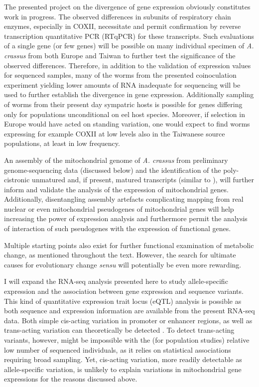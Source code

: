 \documentclass[10pt]{article}
\begin{document}
The presented project on the divergence of gene expression obviously
constitutes work in progress. The observed differences in subunits of
respiratory chain enzymes, especially in COXII, necessitate and permit
confirmation by reverse transcription quantitative PCR (RTqPCR) for
these transcripts. Such evaluations of a single gene (or few genes)
will be possible on many individual specimen of \textit{A. crassus}
from both Europe and Taiwan to further test the significance of the
observed differences. Therefore, in addition to the validation of
expression values for sequenced samples, many of the worms from the
presented coinoculation experiment yielding lower amounts of RNA
inadequate for sequencing will be used to further establish the
divergence in gene expression. Additionally sampling of worms from
their present day sympatric hosts is possible for genes differing only
for populations unconditional on eel host species. Moreover, if
selection in Europe would have acted on standing variation, one would
expect to find worms expressing for example COXII at low levels also
in the Taiwanese source populations, at least in low frequency.

An assembly of the mitochondrial genome of \textit{A. crassus} from
preliminary genome-sequencing data (discussed below) and the
identification of the poly-cistronic unmatured and, if present,
matured transcripts (similar to \cite{pmid19843606}), will further
inform and validate the analysis of the expression of mitochondrial
genes. Additionally, disentangling assembly artefacts complicating
mapping from real nuclear or even mitochondrial \cite{pmid20026478}
pseudogenes of mitochondrial genes will help increasing the power of
expression analysis and furthermore permit the analysis of interaction
of such pseudogenes with the expression of functional genes.

Multiple starting points also exist for further functional examination
of metabolic change, as mentioned throughout the text. However, the
search for ultimate causes for evolutionary change \textit{sensu}
\cite{mayr1961cause} will potentially be even more rewarding.

I will expand the RNA-seq analysis presented here to study
allele-specific expression and the association between gene expression
and sequence variants. This kind of quantitative expression trait
locus (eQTL) analysis is possible as both sequence and expression
information are available from the present RNA-seq data. Both simple
cis-acting variation in promoter or enhancer regions, as well as
trans-acting variation can theoretically be detected
\cite{pmid21838806}. To detect trans-acting variants, however, might
be impossible with the (for population studies) relative low number of
sequenced individuals, as it relies on statistical associations
requiring broad sampling. Yet, cis-acting variation, more readily
detectable as allele-specific variation, is unlikely to explain
variations in mitochondrial gene expressions for the reasons discussed
above.
\end{document}
